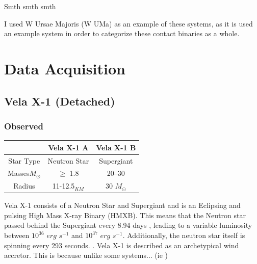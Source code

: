 \documentclass[12pt, letterpaper]{article}
\begin{document}
 

        Smth smth smth

        I used W Ursae Majoris (W UMa) as an example of these systems, as it is used an example system in order to categorize these contact binaries as a whole.

        
\section{\centering Data Acquisition}
    \subsection{\centering Vela X-1 (Detached)}
    
        \subsubsection{Observed}
        \begin{center}
            \begin{tabular}{||c c c||} 
             \hline
             & Vela X-1 A & Vela X-1 B  \\ 
             \hline\hline
             Star Type & Neutron Star & Supergiant \cite{Kretschmar_2021} \\ 
             \hline
             Masses\(M_\odot\) & $\ge$ 1.8 \cite{Kretschmar_2021} & 20–30 \cite{Kretschmar_2021} \\
             \hline
             Radius & 11-12.5$_{KM}$ \cite{Kretschmar_2021} & 30 \(M_\odot\)
             \cite{Kretschmar_2021} \\ %
             \hline 
            \end{tabular}
        \end{center}
        Vela X-1 consists of a Neutron Star and Supergiant and is an Eclipsing and pulsing High Mass X-ray Binary (HMXB). This means that the Neutron star passed behind the Supergiant every 8.94 days \cite{Falanga_2015}, leading to a variable luminosity between $10^{36}$ $erg$ $s^{-1}$ and $10^{37}$ $erg$ $s^{-1}$. Additionally, the neutron star itself is spinning every 293 seconds. \cite{Kretschmar_2021}. 
        Vela X-1 is described as an archetypical wind accretor. This is because unlike some systems... (ie \cite{Kretschmar_2021}) 
            
\end{document}
